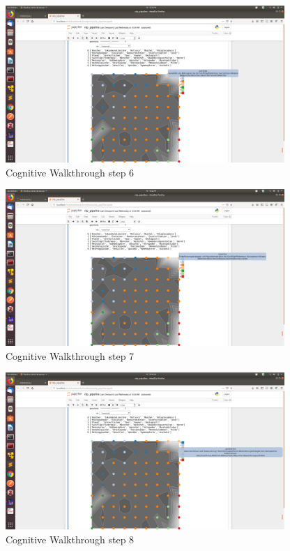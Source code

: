 \begin{figure}[t]
	\centering
	\includegraphics[width=400px]{../chapters/validation/pics/6}
	\caption{\label{pic:step6} Cognitive Walkthrough step 6}
\end{figure}

\begin{figure}[t]
	\centering
	\includegraphics[width=400px]{../chapters/validation/pics/7}
	\caption{\label{pic:step7} Cognitive Walkthrough step 7}
\end{figure}

\begin{figure}[t]
	\centering
	\includegraphics[width=400px]{../chapters/validation/pics/8}
	\caption{\label{pic:step8} Cognitive Walkthrough step 8}
\end{figure}

